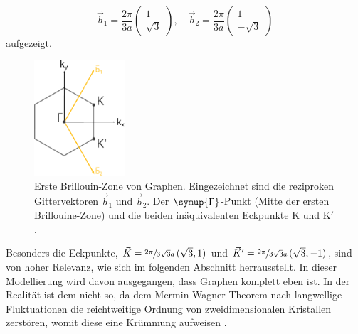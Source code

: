 \begin{equation*}
    \vec{b}_1 = \frac{2\pi}{3a} \begin{pmatrix}  1\\[4pt]   \sqrt{3}  \end{pmatrix}, \quad
    \vec{b}_2 = \frac{2\pi}{3a} \begin{pmatrix}  1\\[4pt] - \sqrt{3} \end{pmatrix}       
\end{equation*}    
aufgezeigt.
\begin{figure}
    \centering
    \includegraphics[width = 0.3\textwidth]{Plots/graphene_first_brillouine_zone.pdf}
    \caption{Erste Brillouin-Zone von Graphen.
    Eingezeichnet sind die reziproken Gittervektoren $\vec{b}_1$ und $\vec{b}_2$.
    Der $\symup{\Gamma}$-Punkt (Mitte der ersten Brillouine-Zone) und die beiden inäquivalenten
    Eckpunkte K und K$'$.}
    \label{fig:first-brillouine-zone}
\end{figure}
Besonders die Eckpunkte, $\vec{K} = \sfrac{2\pi}{3\sqrt{3}a} \, (\sqrt{3},1)$ 
und $\vec{K}' = \sfrac{2\pi}{3\sqrt{3}a} \, (\sqrt{3},-1)$, sind von hoher Relevanz, wie sich im folgenden Abschnitt herrausstellt.
In dieser Modellierung wird davon ausgegangen, dass Graphen komplett eben ist. 
In der Realität ist dem nicht so, da dem Mermin-Wagner Theorem nach langwellige Fluktuationen die reichtweitige Ordnung von zweidimensionalen Kristallen zerstören, womit
diese eine Krümmung aufweisen \cite{Fasolino2007}.
\FloatBarrier
\newpage
